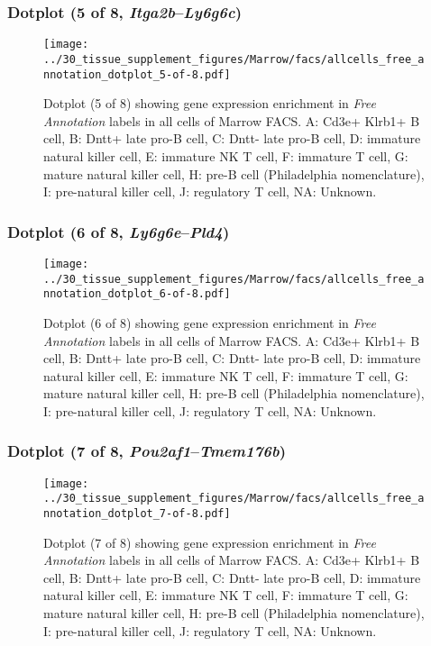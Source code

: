 \clearpage

\subsubsection{Dotplot (5 of 8, \emph{Itga2b}--\emph{Ly6g6c})}
\begin{figure}[h]
\centering
\texttt{[image: ../30\_tissue\_supplement\_figures/Marrow/facs/allcells\_free\_annotation\_dotplot\_5-of-8.pdf]}

\caption{ Dotplot (5 of 8)  showing gene expression enrichment in \emph{Free Annotation} labels in all cells of Marrow FACS. A: Cd3e+ Klrb1+ B cell, B: Dntt+ late pro-B cell, C: Dntt- late pro-B cell, D: immature natural killer cell, E: immature NK T cell, F: immature T cell, G: mature natural killer cell, H: pre-B cell (Philadelphia nomenclature), I: pre-natural killer cell, J: regulatory T cell, NA: Unknown.}
\end{figure}


\clearpage

\subsubsection{Dotplot (6 of 8, \emph{Ly6g6e}--\emph{Pld4})}
\begin{figure}[h]
\centering
\texttt{[image: ../30\_tissue\_supplement\_figures/Marrow/facs/allcells\_free\_annotation\_dotplot\_6-of-8.pdf]}

\caption{ Dotplot (6 of 8)  showing gene expression enrichment in \emph{Free Annotation} labels in all cells of Marrow FACS. A: Cd3e+ Klrb1+ B cell, B: Dntt+ late pro-B cell, C: Dntt- late pro-B cell, D: immature natural killer cell, E: immature NK T cell, F: immature T cell, G: mature natural killer cell, H: pre-B cell (Philadelphia nomenclature), I: pre-natural killer cell, J: regulatory T cell, NA: Unknown.}
\end{figure}


\clearpage

\subsubsection{Dotplot (7 of 8, \emph{Pou2af1}--\emph{Tmem176b})}
\begin{figure}[h]
\centering
\texttt{[image: ../30\_tissue\_supplement\_figures/Marrow/facs/allcells\_free\_annotation\_dotplot\_7-of-8.pdf]}

\caption{ Dotplot (7 of 8)  showing gene expression enrichment in \emph{Free Annotation} labels in all cells of Marrow FACS. A: Cd3e+ Klrb1+ B cell, B: Dntt+ late pro-B cell, C: Dntt- late pro-B cell, D: immature natural killer cell, E: immature NK T cell, F: immature T cell, G: mature natural killer cell, H: pre-B cell (Philadelphia nomenclature), I: pre-natural killer cell, J: regulatory T cell, NA: Unknown.}
\end{figure}


